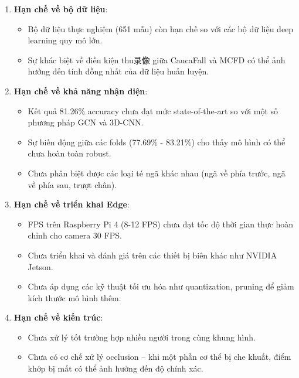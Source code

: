 \begin{enumerate}
    \item \textbf{Hạn chế về bộ dữ liệu}:
    \begin{itemize}
        \item Bộ dữ liệu thực nghiệm (651 mẫu) còn hạn chế so với các bộ dữ liệu deep learning quy mô lớn.
        \item Sự khác biệt về điều kiện thu录像 giữa CaucaFall và MCFD có thể ảnh hưởng đến tính đồng nhất của dữ liệu huấn luyện.
    \end{itemize}
    
    \item \textbf{Hạn chế về khả năng nhận diện}:
    \begin{itemize}
        \item Kết quả 81.26\% accuracy chưa đạt mức state-of-the-art so với một số phương pháp GCN và 3D-CNN.
        \item Sự biến động giữa các folds (77.69\% - 83.21\%) cho thấy mô hình có thể chưa hoàn toàn robust.
        \item Chưa phân biệt được các loại té ngã khác nhau (ngã về phía trước, ngã về phía sau, trượt chân).
    \end{itemize}
    
    \item \textbf{Hạn chế về triển khai Edge}:
    \begin{itemize}
        \item FPS trên Raspberry Pi 4 (8-12 FPS) chưa đạt tốc độ thời gian thực hoàn chỉnh cho camera 30 FPS.
        \item Chưa triển khai và đánh giá trên các thiết bị biên khác như NVIDIA Jetson.
        \item Chưa áp dụng các kỹ thuật tối ưu hóa như quantization, pruning để giảm kích thước mô hình thêm.
    \end{itemize}
    
    \item \textbf{Hạn chế về kiến trúc}:
    \begin{itemize}
        \item Chưa xử lý tốt trường hợp nhiều người trong cùng khung hình.
        \item Chưa có cơ chế xử lý occlusion -- khi một phần cơ thể bị che khuất, điểm khớp bị mất có thể ảnh hưởng đến độ chính xác.
    \end{itemize}
\end{enumerate}

